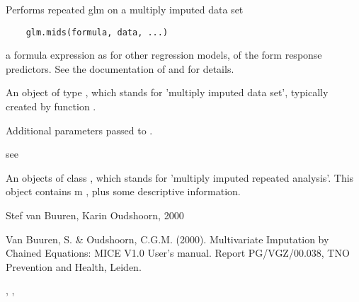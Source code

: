 \documentclass{article}
\begin{document}
\begin{Description}\relax
Performs repeated glm on a multiply imputed data set
\end{Description}
\begin{Usage}
\begin{verbatim}
    glm.mids(formula, data, ...)
\end{verbatim}
\end{Usage}
\begin{Arguments}
\begin{ldescription}
\item[\code{formula}] a formula expression as for other regression models, of the form 
response ~ predictors. See the documentation
of  and  for details.
\item[\code{data}] An object of type , which stands for 'multiply imputed data set', typically
created by function .
\item[\code{...}] Additional parameters passed to .
\end{ldescription}
\end{Arguments}
\begin{Details}\relax
see 
\end{Details}
\begin{Value}
An objects of class , which stands for 'multiply imputed repeated analysis'.
This object contains m , plus some descriptive information.
\end{Value}
\begin{Author}\relax
Stef van Buuren, Karin Oudshoorn, 2000
\end{Author}
\begin{References}\relax
Van Buuren, S. \& Oudshoorn, C.G.M. (2000). Multivariate Imputation by Chained Equations: 
MICE V1.0 User's manual. Report PG/VGZ/00.038, TNO Prevention and Health, Leiden.
\end{References}
\begin{SeeAlso}\relax
{},  , 
\end{SeeAlso}
\end{document}
